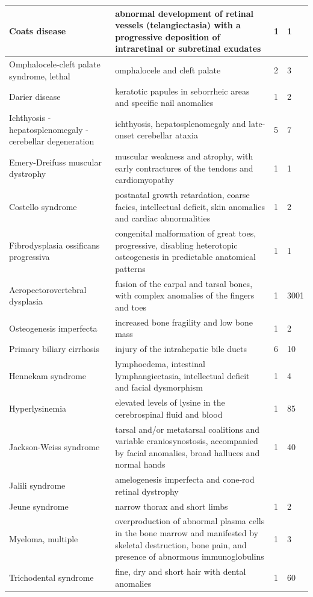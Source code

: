 \documentclass[10pt,letterpaper,final]{article}
\begin{document}
\begin{center}
\begin{small}
\begin{longtable}{|p{3.5cm}|p{6cm}|p{1.8cm}|p{1.8cm}|}
    \hline
    Coats disease & abnormal development of retinal vessels (telangiectasia) with a progressive deposition of intraretinal or subretinal exudates & 1 & 1\\
    \hline
    Omphalocele-cleft palate syndrome, lethal & omphalocele and cleft palate & 2 & 3\\
    \hline
    Darier disease & keratotic papules in seborrheic areas and specific nail anomalies & 1 & 2\\
    \hline
    Ichthyosis - hepatosplenomegaly - cerebellar degeneration & ichthyosis, hepatosplenomegaly and late-onset cerebellar ataxia & 5 & 7\\
    \hline
    Emery-Dreifuss muscular dystrophy & muscular weakness and atrophy, with early contractures of the tendons and cardiomyopathy & 1 & 1\\
    \hline
    Costello syndrome & postnatal growth retardation, coarse facies, intellectual deficit, skin anomalies and cardiac abnormalities & 1 & 2\\
    \hline
    Fibrodysplasia ossificans progressiva & congenital malformation of great toes, progressive, disabling heterotopic osteogenesis in predictable anatomical patterns & 1 & 1\\
    \hline
    Acropectorovertebral dysplasia & fusion of the carpal and tarsal bones, with complex anomalies of the fingers and toes & 1 & 3001\\
    \hline
    Osteogenesis imperfecta & increased bone fragility and low bone mass & 1 & 2\\
    \hline
    Primary biliary cirrhosis & injury of the intrahepatic bile ducts & 6 & 10\\
    \hline
    Hennekam syndrome & lymphoedema, intestinal lymphangiectasia, intellectual deficit and facial dysmorphism & 1 & 4\\
    \hline
    Hyperlysinemia & elevated levels of lysine in the cerebrospinal fluid and blood & 1 & 85\\
    \hline
    Jackson-Weiss syndrome & tarsal and/or metatarsal coalitions and variable craniosynostosis, accompanied by facial anomalies, broad halluces and normal hands & 1 & 40\\
    \hline
    Jalili syndrome & amelogenesis imperfecta and cone-rod retinal dystrophy &  & \\
    \hline
    Jeune syndrome & narrow thorax and short limbs & 1 & 2\\
    \hline
    Myeloma, multiple & overproduction of abnormal plasma cells in the bone marrow and manifested by skeletal destruction, bone pain, and presence of abnormous immunoglobulins & 1 & 3\\
    \hline
    Trichodental syndrome & fine, dry and short hair with dental anomalies & 1 & 60\\
    \hline
    \end{longtable}
\end{small}
\end{center}
\end{document}
